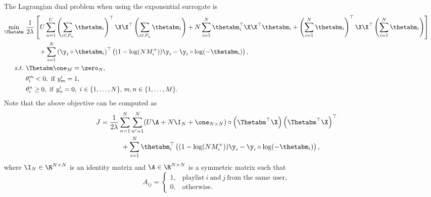The Lagrangian dual problem when using the exponential surrogate is
\begin{equation}
\label{eq:dual_nsr}
\begin{aligned}
\min_{\Thetabm} \ & \frac{1}{2 \lambda} \left[
     U \sum_{u=1}^U \left( \sum_{i \in P_u} \thetabm_i \right)^\top \X \X^\top \left( \sum_{i \in P_u} \thetabm_i \right)
   + N \sum_{i=1}^N \thetabm_i^\top \X \X^\top \thetabm_i
   + \left( \sum_{i=1}^N \thetabm_i \right)^\top \X \X^\top \left( \sum_{i=1}^N \thetabm_i \right) \right] \\
& \hspace{2em}
   + \sum_{i=1}^N \left( \y_i \circ \thetabm_i \right)^\top \left( (1 - \log(N M_i^+)) \y_i - \y_i \circ \log(-\thetabm_i) \right), \\
s.t. \ 
& \Thetabm \one_M = \zero_N, \\
& \theta_i^m < 0, \ \mathrm{if} \ y_m^i = 1, \\
& \theta_i^n \ge 0, \ \mathrm{if} \ y_n^i = 0, \ i \in \{1,\dots,N\}, \, m,n \in \{1,\dots,M\}.
\end{aligned}
\end{equation}
Note that the above objective can be computed as
\begin{equation*}
\begin{aligned}
J &= \frac{1}{2 \lambda} \sum_{n=1}^N \sum_{n'=1}^N (U \A + N \I_N + \one_{N \times N}) 
     \circ \left( \Thetabm^\top \X \right) \left( \Thetabm^\top \X \right)^\top \\
& \hspace{3em}
     + \sum_{i=1}^N \thetabm_i^\top \left( (1 - \log(N M_i^+)) \y_i - \y_i \circ \log(-\thetabm_i) \right),
\end{aligned}
\end{equation*}
where $\I_N \in \R^{N \times N}$ is an identity matrix and $\A \in \R^{N \times N}$ is a symmetric matrix such that
\begin{equation*}
A_{ij} = 
\begin{cases}
1, & \text{playlist} \ i \ \text{and} \ j \ \text{from the same user}, \\
0, & \text{otherwise}.
\end{cases}
\end{equation*}

